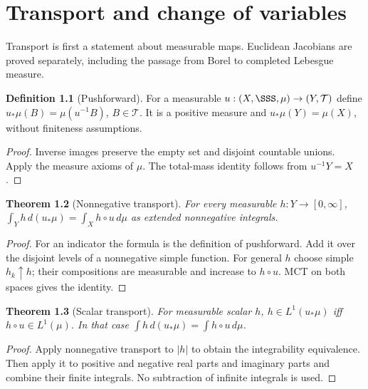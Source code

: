 \documentclass[11pt,oneside,openany]{book}
\newtheorem{theorem}{Theorem}[chapter]
\theoremstyle{definition}
\newtheorem{definition}[theorem]{Definition}
\theoremstyle{remark}
\newcommand{\family}[1]{}
\begin{document}


\chapter{Transport and change of variables}\label{ch:d11-09}

Transport is first a statement about measurable maps. Euclidean Jacobians
are proved separately, including the passage from Borel to completed
Lebesgue measure.

\begin{definition}[Pushforward]\family{D11.09.pushforward}\label{d11:09:pushforward}
For a measurable $u:(X,\SSS,\mu)\to(Y,\mathcal T)$ define
$u_*\mu(B)=\mu(u^{-1}B)$, $B\in\mathcal T$. It is a positive measure
and $u_*\mu(Y)=\mu(X)$, without finiteness assumptions.
\end{definition}
\begin{proof}
Inverse images preserve the empty set and disjoint countable unions.
Apply the measure axioms of $\mu$. The total-mass identity follows from
$u^{-1}Y=X$.
\end{proof}

\begin{theorem}[Nonnegative transport]\family{D11.09.transport_nonnegative}\label{d11:09:transport-nonnegative}
For every measurable $h:Y\to[0,\infty]$,
$\int_Yh\,d(u_*\mu)=\int_Xh\circ u\,d\mu$ as extended nonnegative
integrals.
\end{theorem}
\begin{proof}
For an indicator the formula is the definition of pushforward. Add it
over the disjoint levels of a nonnegative simple function. For general
$h$ choose simple $h_k\uparrow h$; their compositions are measurable and
increase to $h\circ u$. MCT on both spaces gives the identity.
\end{proof}

\begin{theorem}[Scalar transport]\family{D11.09.transport_integrable}\label{d11:09:transport-integrable}
For measurable scalar $h$, $h\in L^1(u_*\mu)$ iff $h\circ u\in L^1(\mu)$.
In that case $\int h\,d(u_*\mu)=\int h\circ u\,d\mu$.
\end{theorem}
\begin{proof}
Apply nonnegative transport to $|h|$ to obtain the integrability equivalence.
Then apply it to positive and negative real parts and imaginary parts and
combine their finite integrals. No subtraction of infinite integrals is used.
\end{proof}
\end{document}
